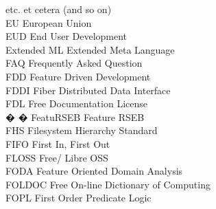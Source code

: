 \begin{tabbing}
    \>etc. \>\>et cetera (and so on)\\



    \>EU \>\>European Union\\

    \>EUD \>\>End User Development\\

    \>Extended ML \>\>Extended Meta Language\\

    \>FAQ \>\>Frequently Asked Question\\



    \>FDD \>\>Feature Driven Development\\

    \>FDDI \>\>Fiber Distributed Data Interface\\

    \>FDL \>\>Free Documentation License\\

� � \>FeatuRSEB \>\>Feature RSEB\\


    \>FHS \>\>Filesystem Hierarchy Standard\\


    \>FIFO \>\>First In, First Out\\

    \>FLOSS \>\>Free/ Libre OSS\\

    \>FODA \>\>Feature Oriented Domain Analysis\\

    \>FOLDOC \>\>Free On-line Dictionary of Computing\\

    \>FOPL \>\>First Order Predicate Logic\\


\end{tabbing}
